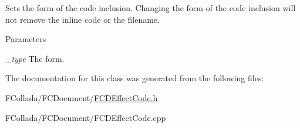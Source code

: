 \label{classFCDEffectCode_aee0f522cea26f2b8414c6c023f15702b}
Sets the form of the code inclusion. Changing the form of the code inclusion will not remove the inline code or the filename. 
\begin{DoxyParams}{Parameters}
\item[{\em \_\-type}]The form. \end{DoxyParams}


The documentation for this class was generated from the following files:\begin{DoxyCompactItemize}
\item 
FCollada/FCDocument/\hyperlink{FCDEffectCode_8h}{FCDEffectCode.h}\item 
FCollada/FCDocument/FCDEffectCode.cpp\end{DoxyCompactItemize}
